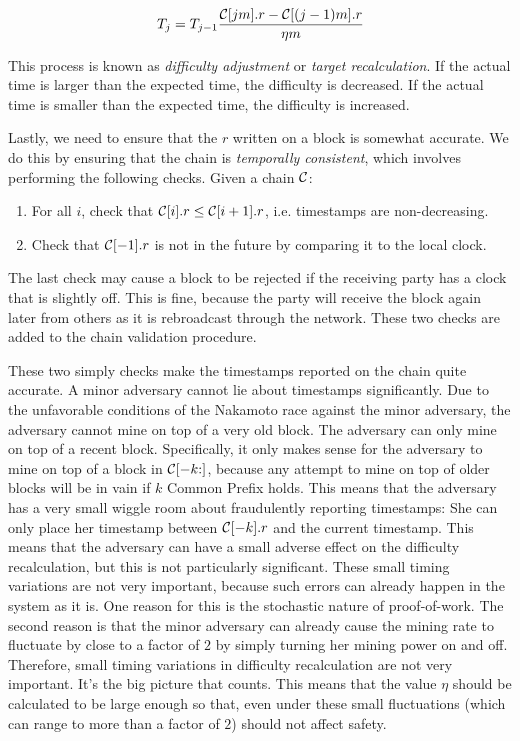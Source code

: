 \[
    T_j = T_{j - 1} \frac{\mathcal{C}[jm].r - \mathcal{C}[(j - 1)m].r}{\eta m}
\]

This process is known as \emph{difficulty adjustment} or \emph{target
recalculation}. If the actual time is larger than the expected time,
the difficulty is decreased. If the actual time is smaller than the
expected time, the difficulty is increased.

Lastly, we need to ensure that the $r$ written on a block is somewhat
accurate. We do this by ensuring that the chain is \emph{temporally consistent},
which involves performing the following checks. Given a chain $\mathcal{C}$:

\begin{enumerate}
  \item For all $i$, check that $\mathcal{C}[i].r \leq \mathcal{C}[i + 1].r$, i.e. timestamps are non-decreasing.
  \item Check that $\mathcal{C}[-1].r$ is not in the future by comparing it to the local clock.
\end{enumerate}

The last check may cause a block to be rejected if the receiving party
has a clock that is slightly off. This is fine, because the party will
receive the block again later from others as it is rebroadcast through
the network. These two checks are added to the chain validation procedure.

These two simply checks make the timestamps reported on the chain quite
accurate. A minor adversary cannot lie about timestamps significantly.
Due to the unfavorable conditions of the Nakamoto race against the minor
adversary, the adversary cannot mine on top of a very old block. The
adversary can only mine on top of a recent block. Specifically, it only
makes sense for the adversary to mine on top of a block in
$\mathcal{C}[{-k}{:}]$, because any attempt to mine on top of older blocks
will be in vain if $k$ Common Prefix holds. This means that the adversary
has a very small wiggle room about fraudulently reporting timestamps:
She can only place her timestamp between $\mathcal{C}[{-k}].r$ and the current
timestamp. This means that the adversary can have a small adverse effect
on the difficulty recalculation, but this is not particularly significant.
These small timing variations are not very important, because such errors
can already happen in the system as it is. One reason for this is the
stochastic nature of proof-of-work.
The second reason is that the minor adversary can already cause the mining rate to fluctuate
by close to a factor of $2$ by simply turning her mining power on and off.
Therefore, small timing variations in difficulty recalculation are not very important.
It's the big picture that counts. This means that the value $\eta$ should be
calculated to be large enough so that, even under these small fluctuations
(which can range to more than a factor of $2$) should not affect safety.

